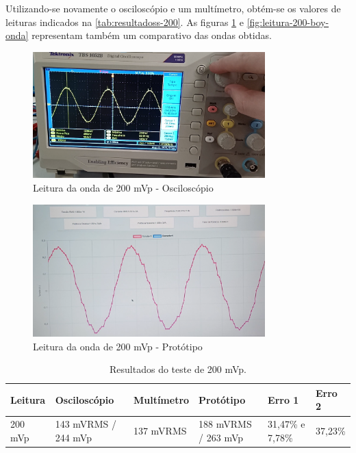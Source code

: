 Utilizando-se novamente o osciloscópio e um multímetro, obtém-se os valores de leituras indicados na \autoref{tab:resultadoss-200}. As figuras \ref{fig:leitura-200-osc} e \autoref{fig:leitura-200-boy-onda} representam também um comparativo das ondas obtidas.

\begin{figure}[htb!]
    \caption{Leitura da onda de 200 mVp - Osciloscópio}
    \label{fig:leitura-200-osc}
    \includegraphics[width=0.8\textwidth]{figuras/leitura-200-osc.png}
    \fonte{}
\end{figure}

\begin{figure}[htb!]
    \caption{Leitura da onda de 200 mVp - Protótipo}
    \label{fig:leitura-200-boy-onda}
    \includegraphics[width=0.8\textwidth]{figuras/leitura-200-boy-onda.png}
    \fonte{}
\end{figure}

\begin{table}[!ht]
    \centering
    \caption{Resultados do teste de 200 mVp.}
    \label{tab:resultadoss-200}
    \begin{tabular}{ p{2cm} p{3cm} p{2cm} p{2cm} p{2cm} p{2cm} }
        \hline
        \textbf{Leitura} & \textbf{Osciloscópio} & \textbf{Multímetro} & \textbf{Protótipo}    & \textbf{Erro 1}  & \textbf{Erro 2}   \\ \hline
        200 mVp          & 143 mVRMS / 244 mVp   & 137 mVRMS           & 188 mVRMS / 263 mVp   & 31,47\% e 7,78\% & 37,23\%           \\ \hline
    \end{tabular}
    \fonte{}
\end{table}

